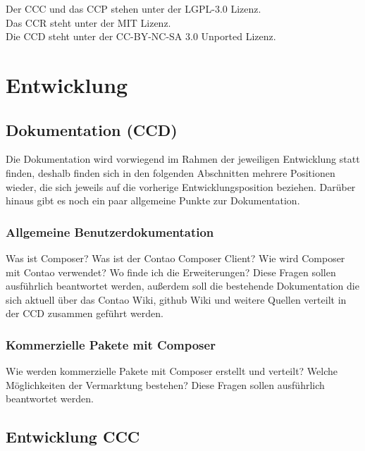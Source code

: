 \documentclass[
paper=a4,
draft=false,%
fontsize=10pt%
]{scrartcl}
\begin{document}
Der CCC und das CCP stehen unter der LGPL-3.0 Lizenz.\\
Das CCR steht unter der MIT Lizenz. \\
Die CCD steht unter der CC-BY-NC-SA 3.0 Unported Lizenz.

\newpage

%
%

\section{Entwicklung}
\label{sec:development}

\subsection{Dokumentation (CCD)}
\label{subsec:ccd}

Die Dokumentation wird vorwiegend im Rahmen der jeweiligen Entwicklung statt finden, deshalb finden sich in den folgenden Abschnitten mehrere Positionen  wieder, die sich jeweils auf die vorherige Entwicklungsposition beziehen. Darüber hinaus gibt es noch ein paar allgemeine Punkte zur Dokumentation.

\subsubsection{Allgemeine Benutzerdokumentation}

Was ist Composer? Was ist der Contao Composer Client? Wie wird Composer mit Contao verwendet? Wo finde ich die Erweiterungen?
Diese Fragen sollen ausführlich beantwortet werden, außerdem soll die bestehende Dokumentation die sich aktuell über das Contao Wiki, github Wiki und weitere Quellen verteilt in der CCD zusammen geführt werden.

\subsubsection{Kommerzielle Pakete mit Composer}

Wie werden kommerzielle Pakete mit Composer erstellt und verteilt? Welche Möglichkeiten der Vermarktung bestehen? Diese Fragen sollen ausführlich beantwortet werden.

\pagebreak

\subsection{Entwicklung CCC}
\label{subsec:ccc}
\end{document}
